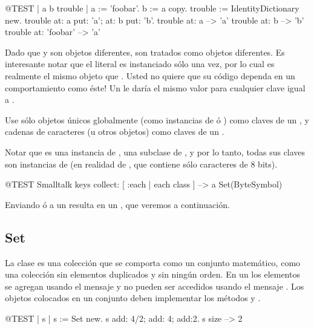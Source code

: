 \documentclass[a4paper,10pt,twoside]{book}
\begin{document}
\begin{code}{@TEST | a b trouble |}
a := 'foobar'.
b := a copy.
trouble := IdentityDictionary new.
trouble at: a put: 'a'; at: b put: 'b'.
trouble at: a          --> 'a'
trouble at: b          --> 'b'
trouble at: 'foobar' --> 'a'
\end{code}

\noindent
Dado que  y  son objetos diferentes, son tratados como objetos diferentes.
Es interesante notar que el literal \mbox{} es instanciado s\'olo una vez, por lo cual es realmente el mismo objeto que .
Usted no quiere que su c\'odigo dependa en un comportamiento como \'este!
Un  le dar\'ia el mismo valor para cualquier clave igual a .

Use s\'olo objetos \'unicos globalmente (como instancias de  \'o ) como claves de un , y cadenas de caracteres (u otros objetos) como claves de un .


Notar que  es una instancia de , una subclase de , y por lo tanto, todas sus claves son instancias de  (en realidad de , que contiene s\'olo caracteres de 8 bits).

\begin{code}{@TEST}
Smalltalk keys collect: [ :each | each class ] --> a Set(ByteSymbol)
\end{code}
\noindent
Enviando  \'o  a un  resulta en un , que veremos a continuaci\'on.

\subsection{Set}
La clase  es una colecci\'on que se comporta como un conjunto matem\'atico, \ie como una colecci\'on sin elementos duplicados y sin ning\'un orden. En un  los elementos se agregan usando el mensaje  y no pueden ser accedidos usando el mensaje . Los objetos colocados en un conjunto deben implementar los m\'etodos  y \ct{=}.

\begin{code}{@TEST | s | }
s := Set new.
s add: 4/2; add: 4; add:2.
s size --> 2
\end{code}
\end{document}
